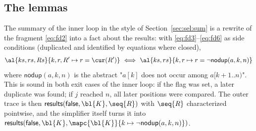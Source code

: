 \subsection{The lemmas}
The summary of the inner loop in the style of Section~\ref{sec:sel:sum} is a rewrite of the fragment \eqref{eq:fd2}
into a fact about the results: with \eqref{eq:fd3}--\eqref{eq:fd6} as
side conditions (duplicated and identified by equations where closed),
\begin{align*}
  \al{ks, rs, Rs}{k, r, R' \mapsto r = \cur(R')}\ \Longleftrightarrow\ \al{ks, rs}{k, r \mapsto r = \neg\mathsf{nodup}(a, k, n)}
\end{align*}
where $\mathsf{nodup}(a, k, n)$ is the abstract "$a[k]$ does not occur among $a[k + 1..n)$". This is
sound in both exit cases of the inner loop: if the flag was set, a later duplicate was found; if $j$
reached $n$, all later positions were compared. The outer trace is then
$\mathsf{results}(\mathsf{false}, \bl{K}, \seq{R})$ with $\seq{R}$ characterized pointwise, and the
simplifier itself turns it into $\mathsf{results}(\mathsf{false}, \bl{K}, \mapc{\bl{K}}{k \mapsto \neg\mathsf{nodup}(a, k, n)})$.

